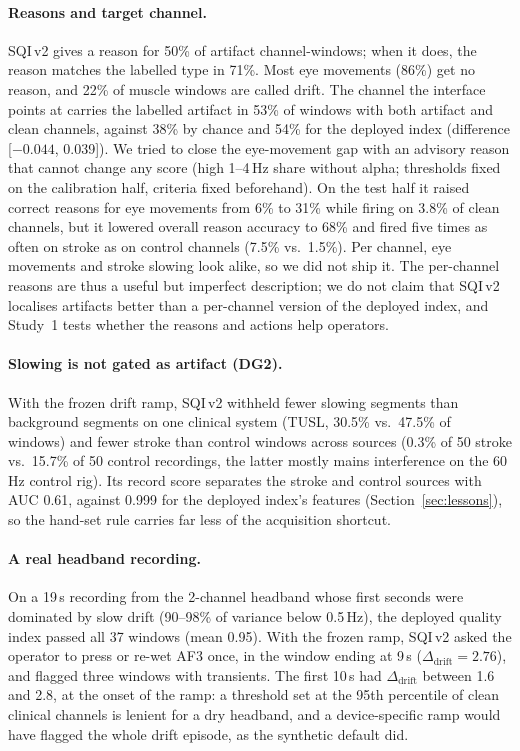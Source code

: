 \documentclass[sigconf,review,anonymous]{acmart}
\newcommand{\sqiv}{SQI\,v2}
\begin{document}
\paragraph{Reasons and target channel.}
\sqiv{} gives a reason for 50\% of artifact channel-windows; when it does, the reason matches the labelled type in 71\%. Most eye movements (86\%) get no reason, and 22\% of muscle windows are called drift. The channel the interface points at carries the labelled artifact in 53\% of windows with both artifact and clean channels, against 38\% by chance and 54\% for the deployed index (difference [$-0.044$, 0.039]). We tried to close the eye-movement gap with an advisory reason that cannot change any score (high 1--4\,Hz share without alpha; thresholds fixed on the calibration half, criteria fixed beforehand). On the test half it raised correct reasons for eye movements from 6\% to 31\% while firing on 3.8\% of clean channels, but it lowered overall reason accuracy to 68\% and fired five times as often on stroke as on control channels (7.5\% vs.\ 1.5\%). Per channel, eye movements and stroke slowing look alike, so we did not ship it. The per-channel reasons are thus a useful but imperfect description; we do not claim that \sqiv{} localises artifacts better than a per-channel version of the deployed index, and Study~1 tests whether the reasons and actions help operators.

\paragraph{Slowing is not gated as artifact (DG2).}
With the frozen drift ramp, \sqiv{} withheld fewer slowing segments than background segments on one clinical system (TUSL, 30.5\% vs.\ 47.5\% of windows) and fewer stroke than control windows across sources (0.3\% of 50 stroke vs.\ 15.7\% of 50 control recordings, the latter mostly mains interference on the 60\,Hz control rig). Its record score separates the stroke and control sources with AUC 0.61, against 0.999 for the deployed index's features (Section~\ref{sec:lessons}), so the hand-set rule carries far less of the acquisition shortcut.

\paragraph{A real headband recording.}
On a 19\,s recording from the 2-channel headband whose first seconds were dominated by slow drift (90--98\% of variance below 0.5\,Hz), the deployed quality index passed all 37 windows (mean 0.95). With the frozen ramp, \sqiv{} asked the operator to press or re-wet AF3 once, in the window ending at 9\,s ($\Delta_{\text{drift}} = 2.76$), and flagged three windows with transients. The first 10\,s had $\Delta_{\text{drift}}$ between 1.6 and 2.8, at the onset of the ramp: a threshold set at the 95th percentile of clean clinical channels is lenient for a dry headband, and a device-specific ramp would have flagged the whole drift episode, as the synthetic default did.
\end{document}
